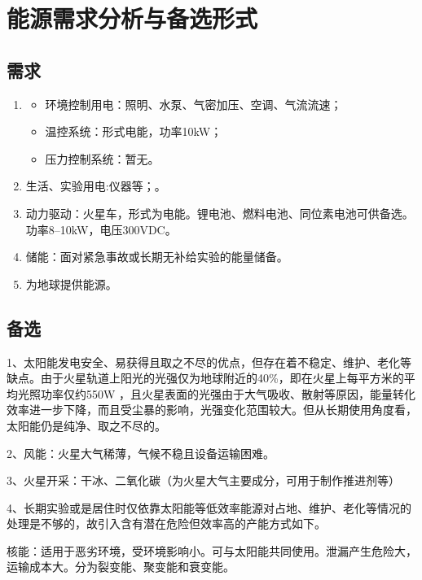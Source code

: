 \def\WattPerMetreSquared{\si{\watt\per\metre\squared}}
\def\SolarPeakRate{218.58\WattPerMetreSquared}
\chapter{能源需求分析与备选形式}
\label{chp:energy}
\section{需求}
\label{sec:energy-request}

\begin{enumerate}
  \item
    \begin{itemize}
      \item 环境控制用电：照明、水泵、气密加压、空调、气流流速；
      \item 温控系统：形式电能，功率10\si{\kilo\watt}；
      \item 压力控制系统：暂无。
    \end{itemize}
  \item 生活、实验用电:仪器等；。
  \item   动力驱动：火星车，形式为电能。锂电池、燃料电池、同位素电池可供备选。功率8--10\si{\kilo\watt}，电压300\si{\volt}DC。
  \item   储能：面对紧急事故或长期无补给实验的能量储备。
  \item   为地球提供能源。
\end{enumerate}

\section{备选}
\label{sec:energy-solution}

1、太阳能发电安全、易获得且取之不尽的优点，但存在着不稳定、维护、老化等缺点。由于火星轨道上阳光的光强仅为地球附近的40\%，即在火星上每平方米的平均光照功率仅约550\si{\watt} ，且火星表面的光强由于大气吸收、散射等原因，能量转化效率进一步下降，而且受尘暴的影响，光强变化范围较大。但从长期使用角度看，太阳能仍是纯净、取之不尽的。

2、风能：火星大气稀薄，气候不稳且设备运输困难。

3、火星开采：干冰、二氧化碳（为火星大气主要成分，可用于制作推进剂等）

4、长期实验或是居住时仅依靠太阳能等低效率能源对占地、维护、老化等情况的处理是不够的，故引入含有潜在危险但效率高的产能方式如下。

核能：适用于恶劣环境，受环境影响小。可与太阳能共同使用。泄漏产生危险大，运输成本大。分为裂变能、聚变能和衰变能。

